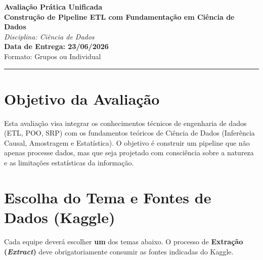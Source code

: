 \documentclass[12pt,a4paper]{article}
\begin{document}
	\noindent
	\begin{center}
		\LARGE \textbf{Avaliação Prática Unificada} \\
		\vspace{0.2cm}
		\large \textbf{Construção de Pipeline ETL com Fundamentação em Ciência de Dados} \\
		\vspace{0.4cm}
		\normalsize \textit{Disciplina: Ciência de Dados} \\
		\textbf{Data de Entrega: 23/06/2026} \\
		\normalsize Formato: Grupos ou Individual
	\end{center}

	\vspace{0.2cm}
	\noindent\rule{\textwidth}{0.4pt}
	\vspace{0.5cm}

	\section{Objetivo da Avaliação}
	Esta avaliação visa integrar os conhecimentos técnicos de engenharia de dados (ETL, POO, SRP) com os fundamentos teóricos de Ciência de Dados (Inferência Causal, Amostragem e Estatística). O objetivo é construir um pipeline que não apenas processe dados, mas que seja projetado com consciência sobre a natureza e as limitações estatísticas da informação.

	\section{Escolha do Tema e Fontes de Dados (Kaggle)}
	Cada equipe deverá escolher \textbf{um} dos temas abaixo. O processo de \textbf{Extração (\textit{Extract})} deve obrigatoriamente consumir as fontes indicadas do Kaggle.
\end{document}
